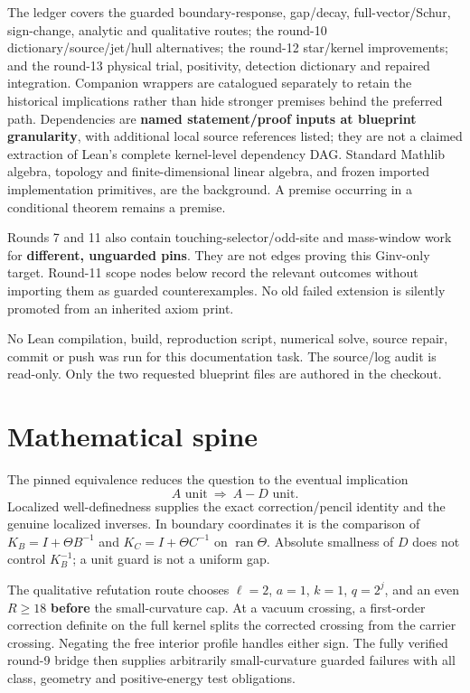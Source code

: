 The ledger covers the guarded boundary-response, gap/decay, full-vector/Schur, sign-change, analytic and qualitative routes; the round-10 dictionary/source/jet/hull alternatives; the round-12 star/kernel improvements; and the round-13 physical trial, positivity, detection dictionary and repaired integration. Companion wrappers are catalogued separately to retain the historical implications rather than hide stronger premises behind the preferred path. Dependencies are \textbf{named statement/proof inputs at blueprint granularity}, with additional local source references listed; they are not a claimed extraction of Lean's complete kernel-level dependency DAG. Standard Mathlib algebra, topology and finite-dimensional linear algebra, and frozen imported implementation primitives, are the background. A premise occurring in a conditional theorem remains a premise.

Rounds 7 and 11 also contain touching-selector/odd-site and mass-window work for \textbf{different, unguarded pins}. They are not edges proving this Ginv-only target. Round-11 scope nodes below record the relevant outcomes without importing them as guarded counterexamples. No old failed extension is silently promoted from an inherited axiom print.

No Lean compilation, build, reproduction script, numerical solve, source repair, commit or push was run for this documentation task. The source/log audit is read-only. Only the two requested blueprint files are authored in the checkout.

\section{Mathematical spine}

The pinned equivalence reduces the question to the eventual implication
\[
 A\text{ unit}\ \Longrightarrow\ A-D\text{ unit}.
\]
Localized well-definedness supplies the exact correction/pencil identity and the genuine localized inverses. In boundary coordinates it is the comparison of \(K_B=I+\Theta B^{-1}\) and \(K_C=I+\Theta C^{-1}\) on \(\operatorname{ran}\Theta\). Absolute smallness of \(D\) does not control \(K_B^{-1}\); a unit guard is not a uniform gap.

The qualitative refutation route chooses \(\ell=2\), \(a=1\), \(k=1\), \(q=2^j\), and an even \(R\ge18\) \textbf{before} the small-curvature cap. At a vacuum crossing, a first-order correction definite on the full kernel splits the corrected crossing from the carrier crossing. Negating the free interior profile handles either sign. The fully verified round-9 bridge then supplies arbitrarily small-curvature guarded failures with all class, geometry and positive-energy test obligations.

